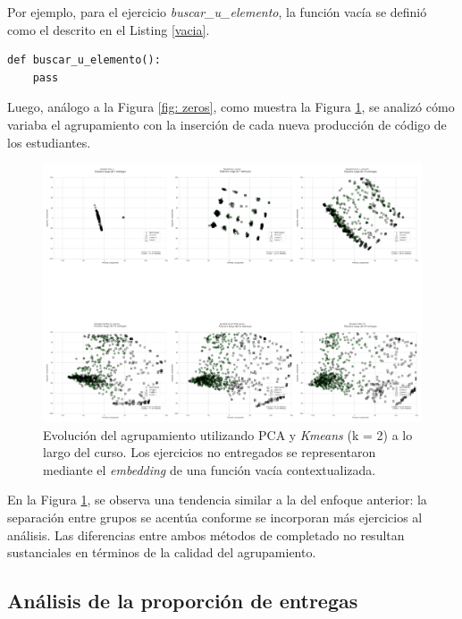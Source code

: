 \documentclass[11pt,a4paper,twoside,openany]{tesis}
\begin{document}
Por ejemplo, para el ejercicio \emph{buscar\_u\_elemento}, la función vacía se definió como el descrito en el Listing \ref{vacia}. 

\begin{lstlisting}[style=pythonstyle, label={vacia}, caption={Ejemplo de función vacía para un ejercicio del curso.}]
def buscar_u_elemento():
    pass
\end{lstlisting}

Luego, análogo a la Figura \ref{fig: zeros}, como muestra la Figura \ref{fig: fill func}, se analizó cómo variaba el agrupamiento con la inserción de cada nueva producción de código de los estudiantes.

\newpage

\begin{figure}[H]
    \centering
    \includegraphics[width=\textwidth]{imagenes/zerostodos_los_graficos_en_una_sola_figura_6.png}
    \caption{Evolución del agrupamiento utilizando PCA y \emph{Kmeans} (k = 2) a lo largo del curso. Los ejercicios no entregados se representaron mediante el \emph{embedding} de una función vacía contextualizada.}
    \label{fig: fill func}
\end{figure}

En la Figura \ref{fig: fill func}, se observa una tendencia similar a la del enfoque anterior: la separación entre grupos se acentúa conforme se incorporan más ejercicios al análisis. Las diferencias entre ambos métodos de completado no resultan sustanciales en términos de la calidad del agrupamiento.

\subsection{Análisis de la proporción de entregas}
\end{document}
